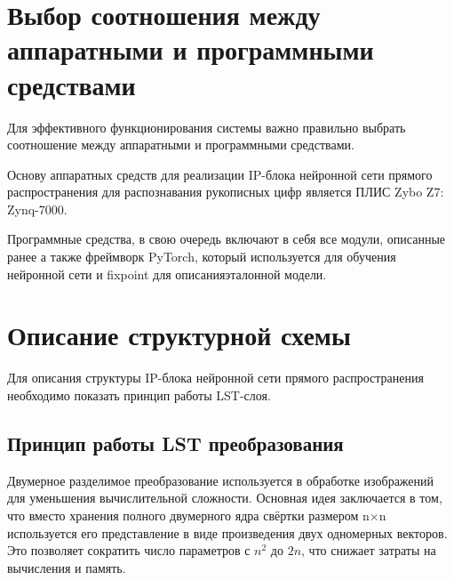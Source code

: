\section{Выбор соотношения между аппаратными и программными средствами}\par
\hspace*{12.5 mm}Для эффективного функционирования системы важно правильно 
выбрать соотношение между аппаратными и программными средствами.

Основу аппаратных средств для реализации IP-блока нейронной сети прямого 
распространения для распознавания рукописных цифр является ПЛИС Zybo Z7: 
Zynq-7000.

Программные средства, в свою очередь включают в себя все модули, описанные 
ранее а также фреймворк PyTorch, который используется для обучения нейронной 
сети и fixpoint для описанияэталонной модели.

\section{Описание структурной схемы}\par
\hspace*{12.5 mm}Для описания структуры IP-блока нейронной сети прямого 
распространения необходимо показать принцип работы LST-слоя.

\subsection{Принцип работы LST преобразования}\par
\hspace*{12.5 mm}Двумерное разделимое преобразование используется в обработке 
изображений для уменьшения вычислительной сложности. Основная идея заключается 
в том, что вместо хранения полного двумерного ядра свёртки размером 
n\(\times\)n используется его представление в виде произведения двух одномерных 
векторов. Это позволяет сократить число параметров с \(n^2\) до \(2n\), что 
снижает затраты на вычисления и память.

